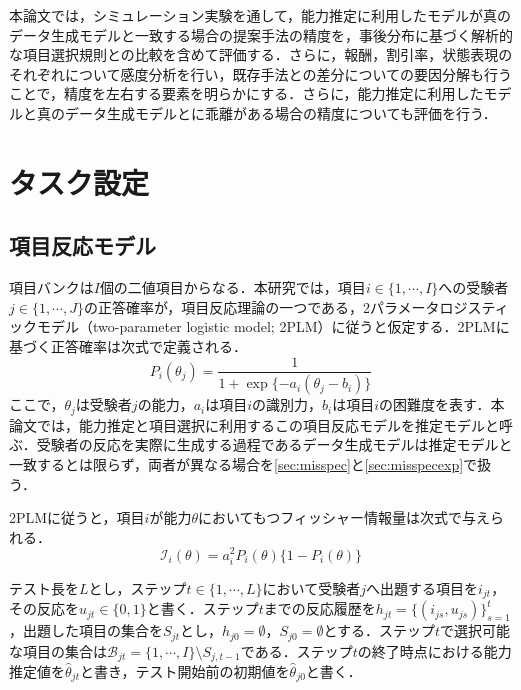 \documentclass[a4paper,12pt,oneside,openany]{jsbook}
\begin{document}
本論文では，シミュレーション実験を通して，能力推定に利用したモデルが真のデータ生成モデルと一致する場合の提案手法の精度を，事後分布に基づく解析的な項目選択規則との比較を含めて評価する．さらに，報酬，割引率，状態表現のそれぞれについて感度分析を行い，既存手法との差分についての要因分解も行うことで，精度を左右する要素を明らかにする．さらに，能力推定に利用したモデルと真のデータ生成モデルとに乖離がある場合の精度についても評価を行う．

\chapter{タスク設定}\label{sec:task}

\section{項目反応モデル}\label{sec:model}

項目バンクは$I$個の二値項目からなる．本研究では，項目$i\in\{1,\cdots,I\}$への受験者$j\in\{1,\cdots,J\}$の正答確率が，項目反応理論の一つである，2パラメータロジスティックモデル（two-parameter logistic model; 2PLM）に従うと仮定する．2PLMに基づく正答確率は次式で定義される．
\begin{equation}
 P_i(\theta_j)=\frac{1}{1+\exp\{-a_i(\theta_j-b_i)\}}
 \label{eq:2pl}
\end{equation}
ここで，$\theta_j$は受験者$j$の能力，$a_i$は項目$i$の識別力，$b_i$は項目$i$の困難度を表す．本論文では，能力推定と項目選択に利用するこの項目反応モデルを推定モデルと呼ぶ．受験者の反応を実際に生成する過程であるデータ生成モデルは推定モデルと一致するとは限らず，両者が異なる場合を\ref{sec:misspec}と\ref{sec:misspecexp}で扱う．

2PLMに従うと，項目$i$が能力$\theta$においてもつフィッシャー情報量は次式で与えられる．
\begin{equation}
 \mathcal{I}_i(\theta)=a_i^2P_i(\theta)\{1-P_i(\theta)\}
 \label{eq:info}
\end{equation}

テスト長を$L$とし，ステップ$t\in\{1,\cdots,L\}$において受験者$j$へ出題する項目を$i_{jt}$，その反応を$u_{jt}\in\{0,1\}$と書く．ステップ$t$までの反応履歴を$h_{jt}=\{(i_{js},u_{js})\}_{s=1}^{t}$，出題した項目の集合を$S_{jt}$とし，$h_{j0}=\emptyset$，$S_{j0}=\emptyset$とする．ステップ$t$で選択可能な項目の集合は$\mathcal{B}_{jt}=\{1,\cdots,I\}\setminus S_{j,t-1}$である．ステップ$t$の終了時点における能力推定値を$\hat\theta_{jt}$と書き，テスト開始前の初期値を$\hat\theta_{j0}$と書く．
\end{document}
